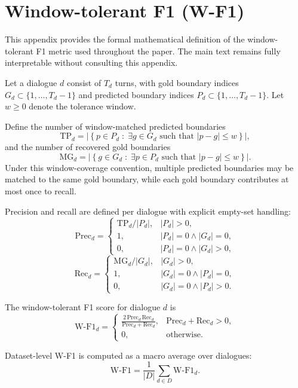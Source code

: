\section{Window-tolerant F1 (W-F1)}
\label{app:wf1}

This appendix provides the formal mathematical definition of the
window-tolerant F1 metric used throughout the paper. The main text
remains fully interpretable without consulting this appendix.

Let a dialogue $d$ consist of $T_d$ turns, with gold boundary indices
$G_d \subset \{1,\dots,T_d-1\}$ and predicted boundary indices
$P_d \subset \{1,\dots,T_d-1\}$. Let $w \ge 0$ denote the tolerance window.

Define the number of window-matched predicted boundaries
\[
\mathrm{TP}_d
= \left|\left\{
p \in P_d \;:\; \exists g \in G_d \text{ such that } |p-g| \le w
\right\}\right|,
\]
and the number of recovered gold boundaries
\[
\mathrm{MG}_d
= \left|\left\{
g \in G_d \;:\; \exists p \in P_d \text{ such that } |p-g| \le w
\right\}\right|.
\]
Under this window-coverage convention, multiple predicted boundaries may be
matched to the same gold boundary, while each gold boundary contributes at most
once to recall.

Precision and recall are defined per dialogue with explicit empty-set handling:
\[
\mathrm{Prec}_d =
\begin{cases}
\mathrm{TP}_d / |P_d|, & |P_d| > 0, \\
1, & |P_d| = 0 \wedge |G_d| = 0, \\
0, & |P_d| = 0 \wedge |G_d| > 0,
\end{cases}
\]
\[
\mathrm{Rec}_d =
\begin{cases}
\mathrm{MG}_d / |G_d|, & |G_d| > 0, \\
1, & |G_d| = 0 \wedge |P_d| = 0, \\
0, & |G_d| = 0 \wedge |P_d| > 0.
\end{cases}
\]

The window-tolerant F1 score for dialogue $d$ is
\[
\mathrm{W\text{-}F1}_d =
\begin{cases}
\displaystyle
\frac{2\,\mathrm{Prec}_d\,\mathrm{Rec}_d}
     {\mathrm{Prec}_d + \mathrm{Rec}_d},
& \mathrm{Prec}_d + \mathrm{Rec}_d > 0, \\
0, & \text{otherwise}.
\end{cases}
\]

Dataset-level W-F1 is computed as a macro average over dialogues:
\[
\mathrm{W\text{-}F1}
= \frac{1}{|D|} \sum_{d \in D} \mathrm{W\text{-}F1}_d .
\]

